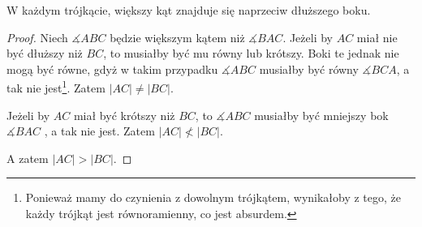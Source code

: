 \documentclass[12pt, a4paper]{scrartcl}
\begin{document}
\begin{theorem}
    W każdym trójkącie, większy kąt znajduje się naprzeciw dłuższego boku.

    \begin{figure}[!h]
        \begin{center}
        \end{center}
    \end{figure}

    \begin{proof}
        Niech \(\measuredangle ABC\) będzie większym kątem niż \(\measuredangle
        BAC\). Jeżeli by \(AC\) miał nie być dłuższy niż \(BC\), to musiałby
        być mu równy lub krótszy. Boki te jednak nie mogą być równe, gdyż
        w takim przypadku \(\measuredangle ABC\) musiałby być równy \(
        \measuredangle BCA\), a tak nie jest\footnote{
            Ponieważ mamy do czynienia z dowolnym trójkątem, wynikałoby z tego,
            że każdy trójkąt jest równoramienny, co jest absurdem.
        }. Zatem \(|AC| \neq |BC|\).

        Jeżeli by \(AC\) miał być krótszy niż \(BC\), to \(\measuredangle ABC\)
        musiałby być mniejszy bok \(\measuredangle BAC\) , a tak nie
        jest. Zatem \(|AC| \nless |BC|\).

        A zatem \(|AC| > |BC|\).
    \end{proof}
\end{theorem}
\end{document}
